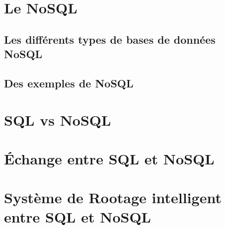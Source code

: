 \section{Le \textsf{NoSQL}}


\subsection{Les différents types de bases de données \textsf{NoSQL}}\label{categorie} 
 

\subsection{Des exemples de \textsf{NoSQL}}


\section{\textsf{SQL} vs \textsf{NoSQL}}


\section{Échange entre \textsf{SQL} et \textsf{NoSQL}}


\section{Système de Rootage intelligent entre \textsf{SQL} et \textsf{NoSQL}}


